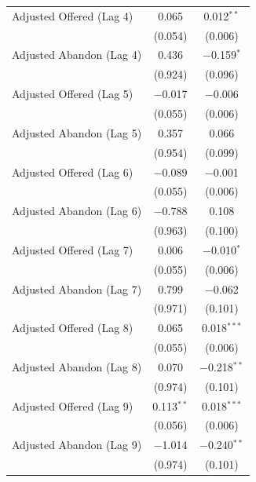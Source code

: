 \documentclass[manuscript,screen,authorversion]{acmart}
\begin{document}
\begin{table}[!htbp]
\begin{tabularx}{0.92\linewidth}{@{\extracolsep{\fill}}>{\raggedright\arraybackslash}Xcc}
Adjusted Offered (Lag 4)  & 0.065 & 0.012$^{**}$ \\
 & {\scriptsize (0.054)} & {\scriptsize (0.006)} \\

Adjusted Abandon (Lag 4)  & 0.436 & $-$0.159$^{*}$ \\
 & {\scriptsize (0.924)} & {\scriptsize (0.096)} \\

Adjusted Offered (Lag 5)  & $-$0.017 & $-$0.006 \\
 & {\scriptsize (0.055)} & {\scriptsize (0.006)} \\

Adjusted Abandon (Lag 5)  & 0.357 & 0.066 \\
 & {\scriptsize (0.954)} & {\scriptsize (0.099)} \\

Adjusted Offered (Lag 6)  & $-$0.089 & $-$0.001 \\
 & {\scriptsize (0.055)} & {\scriptsize (0.006)} \\

Adjusted Abandon (Lag 6)  & $-$0.788 & 0.108 \\
 & {\scriptsize (0.963)} & {\scriptsize (0.100)} \\

Adjusted Offered (Lag 7)  & 0.006 & $-$0.010$^{*}$ \\
 & {\scriptsize (0.055)} & {\scriptsize (0.006)} \\

Adjusted Abandon (Lag 7)  & 0.799 & $-$0.062 \\
 & {\scriptsize (0.971)} & {\scriptsize (0.101)} \\

Adjusted Offered (Lag 8)  & 0.065 & 0.018$^{***}$ \\
 & {\scriptsize (0.055)} & {\scriptsize (0.006)} \\

Adjusted Abandon (Lag 8)  & 0.070 & $-$0.218$^{**}$ \\
 & {\scriptsize (0.974)} & {\scriptsize (0.101)} \\

Adjusted Offered (Lag 9)  & 0.113$^{**}$ & 0.018$^{***}$ \\
 & {\scriptsize (0.056)} & {\scriptsize (0.006)} \\

Adjusted Abandon (Lag 9)  & $-$1.014 & $-$0.240$^{**}$ \\
 & {\scriptsize (0.974)} & {\scriptsize (0.101)} \\


\end{tabularx}
\end{table}
\end{document}
